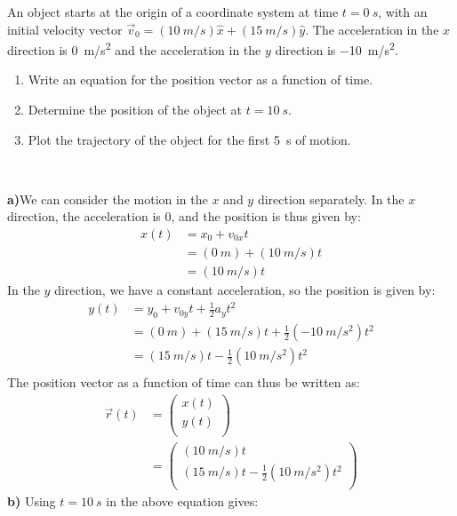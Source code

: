 \begin{example}{An object starts at the origin of a coordinate system at time $t=\SI{0}{s}$, with an initial velocity vector $\vec v_0=(\SI{10}{m/s})\hat x+(\SI{15}{m/s})\hat y$. The acceleration in the $x$ direction is \SI{0}{m/s^2} and the acceleration in the $y$ direction is \SI{-10}{m/s^2}.
\begin{enumerate}[label=(\alph*)]
\item Write an equation for the position vector as a function of time.
\item Determine the position of the object at $t=\SI{10}{s}$.
\item Plot the trajectory of the object for the first \SI{5}{s} of motion.
\end{enumerate}
\ }
\label{ex:describingmotioninnd:parabola}
\textbf{a)}We can consider the motion in the $x$ and $y$ direction separately. In the $x$ direction, the acceleration is 0, and the position is thus given by:
\begin{align*}
x(t)&=x_0+v_{0x}t\\
&=(\SI{0}{m})+(\SI{10}{m/s})t\\
&=(\SI{10}{m/s})t
\end{align*}
In the $y$ direction, we have a constant acceleration, so the position is given by:
\begin{align*}
y(t) &= y_0+v_{0y}t+\frac{1}{2}a_yt^2\\
&=(\SI{0}{m})+(\SI{15}{m/s})t+\frac{1}{2}(\SI{-10}{m/s^2})t^2\\
&=(\SI{15}{m/s})t-\frac{1}{2}(\SI{10}{m/s^2})t^2\\
\end{align*}
The position vector as a function of time can thus be written as:
\begin{align*}
\vec r(t) &= \begin{pmatrix}
           x(t) \\
           y(t) \\
          \end{pmatrix}\\
          &= \begin{pmatrix}
           (\SI{10}{m/s})t \\
           (\SI{15}{m/s})t-\frac{1}{2}(\SI{10}{m/s^2})t^2 \\
         \end{pmatrix}
\end{align*}
\textbf{b)} Using $t=\SI{10}{s}$ in the above equation gives:
\begin{align*}

\end{align*}
\end{example}
